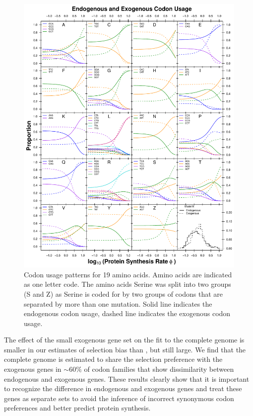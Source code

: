 \documentclass[fleqn,letterpaper]{article}
\begin{document}
\begin{figure}
     \centering
	\includegraphics[width=\textwidth]{img/CUB_cleft_main.pdf}
	\caption{Codon usage patterns for 19 amino acids. Amino acids are indicated as one letter code. 
	The amino acids Serine was split into two groups (S and Z) as Serine is coded for by two groups of codons that are separated by more than one mutation.
	Solid line indicates the endogenous codon usage, dashed line indicates the exogenous codon usage.}
	\label{fig:cub_endo_exo}
\end{figure}

The effect of the small exogenous gene set on the fit to the complete \kluyveri genome is smaller in our estimates of selection bias \DE than \DM, but still large.
We find that the complete \kluyveri genome is estimated to share the selection preference with the exogenous genes in $\sim60\%$ of codon families that show dissimilarity between endogenous and exogenous genes.
These results clearly show that it is important to recognize the difference in endogenous and exogenous genes and treat these genes as separate sets to avoid the inference of incorrect synonymous codon preferences and better predict protein synthesis.
\end{document}

